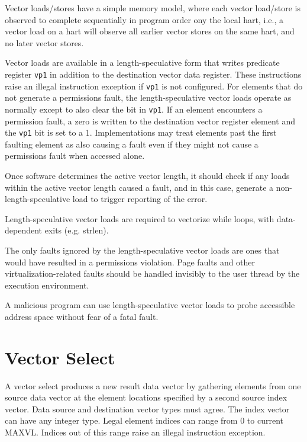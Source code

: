 Vector loads/stores have a simple memory model, where each vector
load/store is observed to complete sequentially in program order ony
the local hart, i.e., a vector load on a hart will observe all earlier
vector stores on the same hart, and no later vector stores.

Vector loads are available in a length-speculative form that writes
predicate register {\tt vp1} in addition to the destination vector
data register.  These instructions raise an illegal instruction
exception if {\tt vp1} is not configured.  For elements that do not
generate a permissions fault, the length-speculative vector loads
operate as normally except to also clear the bit in {\tt vp1}.  If an
element encounters a permission fault, a zero is written to the
destination vector register element and the {\tt vp1} bit is set to a
1.  Implementations may treat elements past the first faulting element
as also causing a fault even if they might not cause a permissions
fault when accessed alone.

Once software determines the active vector length, it should check if
any loads within the active vector length caused a fault, and in this
case, generate a non-length-speculative load to trigger reporting of
the error.

\begin{commentary}
  Length-speculative vector loads are required to vectorize while
  loops, with data-dependent exits (e.g. strlen).

  The only faults ignored by the length-speculative vector loads are
  ones that would have resulted in a permissions violation.  Page
  faults and other virtualization-related faults should be handled
  invisibly to the user thread by the execution environment.

  A malicious program can use length-speculative vector loads to probe
  accessible address space without fear of a fatal fault.
\end{commentary}

\section{Vector Select}

A vector select produces a new result data vector by gathering
elements from one source data vector at the element locations
specified by a second source index vector.  Data source and
destination vector types must agree.  The index vector can have any
integer type.  Legal element indices can range from 0 to current
MAXVL.  Indices out of this range raise an illegal instruction
exception.

